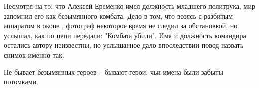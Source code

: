 Несмотря на то, что Алексей Еременко имел должность младшего политрука, мир
запомнил его как безымянного комбата. Дело в том, что возясь с разбитым
аппаратом в окопе , фотограф некоторое время не следил за обстановкой, но
услышал, как по цепи передали: "Комбата убили". Имя и должность командира
остались автору неизвестны, но услышанное дало впоследствии повод назвать
снимок именно так.

Не бывает безымянных героев – бывают герои, чьи имена были забыты потомками.
